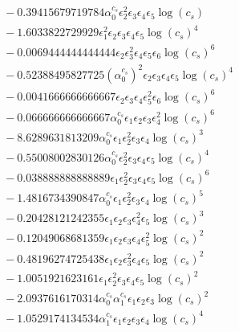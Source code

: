 \documentclass[10pt]{article}
\begin{document}
\begin{align*}
&{}  - 0.39415679719784 \alpha_{0}^{c_s} \epsilon_{2}^{2} \epsilon_{3} \epsilon_{4} \epsilon_{5} \log{\left(c_{s} \right)} \\
&{}  - 1.6033822729929 \epsilon_{1}^{2} \epsilon_{2} \epsilon_{3} \epsilon_{4} \epsilon_{5} \log{\left(c_{s} \right)}^{4} \\
&{}  - 0.0069444444444444 \epsilon_{2} \epsilon_{3}^{2} \epsilon_{4} \epsilon_{5} \epsilon_{6} \log{\left(c_{s} \right)}^{6} \\
&{}  - 0.52388495827725 \left(\alpha_{0}^{c_s}\right)^{2} \epsilon_{2} \epsilon_{3} \epsilon_{4} \epsilon_{5} \log{\left(c_{s} \right)}^{4} \\
&{}  - 0.0041666666666667 \epsilon_{2} \epsilon_{3} \epsilon_{4} \epsilon_{5}^{2} \epsilon_{6} \log{\left(c_{s} \right)}^{6} \\
&{}  - 0.066666666666667 \alpha_{0}^{c_s} \epsilon_{1} \epsilon_{2} \epsilon_{3} \epsilon_{4}^{2} \log{\left(c_{s} \right)}^{6} \\
&{}  - 8.6289631813209 \alpha_{0}^{c_s} \epsilon_{1} \epsilon_{2}^{2} \epsilon_{3} \epsilon_{4} \log{\left(c_{s} \right)}^{3} \\
&{}  - 0.55008002830126 \alpha_{0}^{c_s} \epsilon_{2}^{2} \epsilon_{3} \epsilon_{4} \epsilon_{5} \log{\left(c_{s} \right)}^{4} \\
&{}  - 0.038888888888889 \epsilon_{1} \epsilon_{2}^{2} \epsilon_{3} \epsilon_{4} \epsilon_{5} \log{\left(c_{s} \right)}^{6} \\
&{}  - 1.4816734390847 \alpha_{0}^{c_s} \epsilon_{1} \epsilon_{2}^{2} \epsilon_{3} \epsilon_{4} \log{\left(c_{s} \right)}^{5} \\
&{}  - 0.20428121242355 \epsilon_{1} \epsilon_{2} \epsilon_{3} \epsilon_{4}^{2} \epsilon_{5} \log{\left(c_{s} \right)}^{3} \\
&{}  - 0.12049068681359 \epsilon_{1} \epsilon_{2} \epsilon_{3} \epsilon_{4} \epsilon_{5}^{2} \log{\left(c_{s} \right)}^{2} \\
&{}  - 0.48196274725438 \epsilon_{1} \epsilon_{2} \epsilon_{3}^{2} \epsilon_{4} \epsilon_{5} \log{\left(c_{s} \right)}^{2} \\
&{}  - 1.0051921623161 \epsilon_{1} \epsilon_{2}^{2} \epsilon_{3} \epsilon_{4} \epsilon_{5} \log{\left(c_{s} \right)}^{2} \\
&{}  - 2.0937616170314 \alpha_{0}^{c_s} \alpha_{1}^{c_s} \epsilon_{1} \epsilon_{2} \epsilon_{3} \log{\left(c_{s} \right)}^{2} \\
&{}  - 1.0529174134534 \alpha_{1}^{c_s} \epsilon_{1} \epsilon_{2} \epsilon_{3} \epsilon_{4} \log{\left(c_{s} \right)}^{4}
\end{align*}
\end{document}
